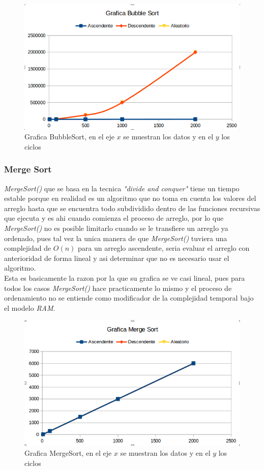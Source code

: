 \documentclass{article}
\begin{document}
		\begin{figure}[H]
			\centering
			\includegraphics[scale = 0.65]{images/e4gbs.png}
			\caption{Grafica BubbleSort, en el eje $x$ se muestran los datos y en el $y$ los ciclos}
		\end{figure}
	
		\subsubsection{Merge Sort}
		
		\emph{MergeSort()} que se basa en la tecnica \emph{"divide and conquer"} tiene un tiempo estable porque en realidad es un algoritmo que no toma en cuenta los valores del arreglo hasta que se encuentra todo subdividido dentro de las funciones recursivas que ejecuta y es ahi cuando comienza el proceso de arreglo, por lo que \emph{MergeSort()} no es posible limitarlo cuando se le transfiere un arreglo ya ordenado, pues tal vez la unica manera de que \emph{MergeSort()} tuviera una complejidad de $O(n)$ para un arreglo ascendente, seria evaluar el arreglo con anterioridad de forma lineal y asi determinar que no es necesario usar el algoritmo.\\
		
		Esta es basicamente la razon por la que su grafica se ve casi lineal, pues para todos los casos \emph{MergeSort()} hace practicamente lo mismo y el proceso de ordenamiento no se entiende como modificador de la complejidad temporal bajo el modelo \emph{RAM}.
		
		\begin{figure}[H]
			\centering
			\includegraphics[scale = 0.7]{images/e4gms.png}
			\caption{Grafica MergeSort, en el eje $x$ se muestran los datos y en el $y$ los ciclos}
		\end{figure}
		\newpage
		
\end{document}
